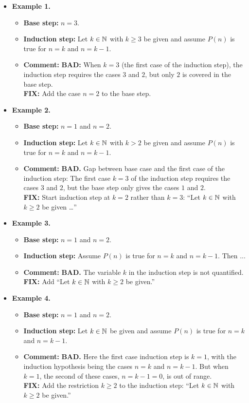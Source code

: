 \begin{itemize}

\item[]  \textbf{Example 1.}
\begin{itemize}
\item \textbf{Base step:} $n=3$.
\item \textbf{Induction step:} Let $k\in \mathbb{N}$ with $k\ge 3$ be given and
assume $P(n)$ is true for $n=k$ and $n=k-1$. 
\item \textbf{Comment:}
\textbf{BAD:} When $k=3$ (the first case of the induction step), the induction 
step requires the cases $3$ and $2$, but only $2$ is covered in the base
step.\\
\textbf{FIX:} Add the case $n=2$ to the base step. 
\end{itemize}
\item[]   \textbf{Example 2.}
\begin{itemize}
\item \textbf{Base step:} $n=1$ and $n=2$.
\item \textbf{Induction step:} Let $k\in \mathbb{N}$ with $k>2$ be given and
assume $P(n)$ is true for $n=k$ and $n=k-1$. 
\item \textbf{Comment:}
\textbf{BAD.} Gap between base case and the first case  
of the induction step: The first case $k=3$ of the induction step
requires the cases $3$ and $2$, but the base step only gives the cases
$1$ and $2$.\\
\textbf{FIX:} Start induction step at $k=2$ rather than $k=3$:
``Let $k\in\mathbb{N}$ with $k\ge 2$ be given \dots''
\end{itemize}

\item[]   \textbf{Example 3.}
\begin{itemize}
\item \textbf{Base step:} $n=1$ and $n=2$.
\item \textbf{Induction step:} Assume 
$P(n)$ is true for $n=k$ and $n=k-1$.   Then ...
\item \textbf{Comment:} \textbf{BAD.} The variable $k$ in the  induction
step is not quantified.\\
\textbf{FIX:} Add ``Let $k\in\mathbb{N}$ with $k\ge2$ be given.''
\end{itemize}

\item[]   \textbf{Example 4.}
\begin{itemize}
\item \textbf{Base step:} $n=1$ and $n=2$.
\item \textbf{Induction step:} Let $k\in \mathbb{N}$ be given and
assume $P(n)$ is true for $n=k$ and $n=k-1$.
\item \textbf{Comment:} 
\textbf{BAD.}  Here the first case induction step is $k=1$, with the induction
hypothesis being the cases $n=k$ and $n=k-1$. But when $k=1$, the second of
these cases, $n=k-1=0$, is out of range.\\
\textbf{FIX:} Add the restriction $k\ge2$ to the induction step:
``Let $k\in\mathbb{N}$ with $k\ge2$ be given.''

\end{itemize}

\end{itemize}
